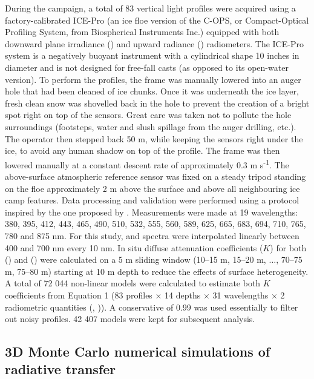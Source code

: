During the campaign, a total of 83 vertical light profiles were acquired using a factory-calibrated ICE-Pro (an ice floe version of the C-OPS, or Compact-Optical Profiling System, from Biospherical Instruments Inc.) equipped with both downward plane irradiance \edz{} (\wmsquare{}) and upward radiance \luz{} (\wmsquaresr{}) radiometers. The ICE-Pro system is a negatively buoyant instrument with a cylindrical shape 10 inches in diameter and is not designed for free-fall casts (as opposed to its open-water version). To perform the profiles, the frame was manually lowered into an auger hole that had been cleaned of ice chunks. Once it was underneath the ice layer, fresh clean snow was shovelled back in the hole to prevent the creation of a bright spot right on top of the sensors. Great care was taken not to pollute the hole surroundings (footsteps, water and slush spillage from the auger drilling, etc.). The operator then stepped back 50 m, while keeping the sensors right under the ice, to avoid any human shadow on top of the profile. The frame was then lowered manually at a constant descent rate of approximately 0.3 m s\textsuperscript{-1}. The above-surface atmospheric reference sensor was fixed on a steady tripod standing on the floe approximately 2 m above the surface and above all neighbouring ice camp features. Data processing and validation were performed using a protocol inspired by the one proposed by \citet{Smith1984}. Measurements were made at 19 wavelengths: 380, 395, 412, 443, 465, 490, 510, 532, 555, 560, 589, 625, 665, 683, 694, 710, 765, 780 and 875 nm. For this study, \ed{} and \lu{} spectra were interpolated linearly between 400 and 700 nm every 10 nm. In situ diffuse attenuation coefficients ($K$) for both \ed{} (\ked{}) and \lu{} (\klu{}) were calculated on a 5 m sliding window (10--15 m, 15--20 m, $\ldots$, 70--75 m, 75--80 m) starting at 10 m depth to reduce the effects of surface heterogeneity. A total of 72 044 non-linear models were calculated to estimate both $K$ coefficients from Equation 1 (83 profiles $\times$ 14 depths $\times$ 31 wavelengths $\times$ 2 radiometric quantities (\ed{}, \lu{})). A conservative \rsquared{} of 0.99 was used essentially to filter out noisy profiles. 42 407 models were kept for subsequent analysis.

\subsection{3D Monte Carlo numerical simulations of radiative transfer}

